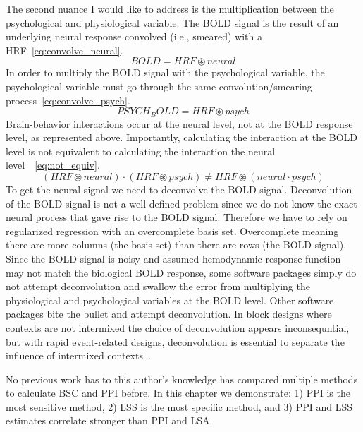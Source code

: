 \documentclass[phd,appendix,figures]{uithesis}
\begin{document}
The second nuance I would like to address is the multiplication between
the psychological and physiological variable.
The BOLD signal is the result of an underlying neural response convolved (i.e., smeared)
with a HRF~\ref{eq:convolve_neural}.
\begin{equation}
  BOLD = HRF \circledast neural
  \label{eq:convolve_neural}
\end{equation}
In order to multiply the BOLD signal with the psychological variable,
the psychological variable must go through the same convolution/smearing process~\ref{eq:convolve_psych}.
\begin{equation}
  PSYCH_BOLD = HRF \circledast psych
  \label{eq:convolve_psych}
\end{equation}
Brain-behavior interactions occur at the neural level, not at the
BOLD response level, as represented above.
Importantly, calculating the interaction at the BOLD level is not
equivalent to calculating the interaction the neural level~\cite{Gitelman2003}~\ref{eq:not_equiv}.
\begin{equation}
  (HRF \circledast neural) \cdot (HRF \circledast psych) \neq HRF \circledast (neural \cdot psych)
  \label{eq:not_equiv}
\end{equation}
To get the neural signal we need to deconvolve the BOLD signal.
Deconvolution of the BOLD signal is not a well defined problem since
we do not know the exact neural process that gave rise to the BOLD signal.
Therefore we have to rely on regularized regression with an overcomplete
basis set.
Overcomplete meaning there are more columns (the basis set) than there
are rows (the BOLD signal).
Since the BOLD signal is noisy and assumed hemodynamic response function
may not match the biological BOLD response, some software packages simply do not attempt
deconvolution and swallow the error from multiplying the physiological and psychological
variables at the BOLD level.
Other software packages bite the bullet and attempt deconvolution.
In block designs where contexts are not intermixed the choice of
deconvolution appears inconsequntial, but with rapid event-related designs,
deconvolution is essential to separate the influence of intermixed contexts~\cite{Gitelman2003}.

No previous work has to this author's knowledge has compared multiple methods to calculate BSC
and PPI before.
In this chapter we demonstrate:
1) PPI is the most sensitive method,
2) LSS is the most specific method, and
3) PPI and LSS estimates correlate stronger than PPI and LSA.
\end{document}
